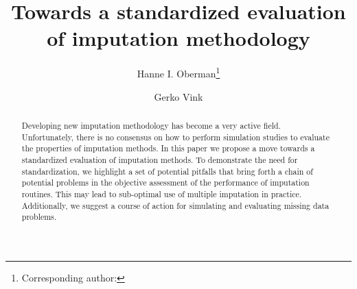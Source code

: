 \documentclass[bimj,fleqn]{w-art}
\begin{document}
\keywords{Evaluation; Imputation; Missing data; Simulation studies;\\ [1pc]
\noindent \hspace*{-4pc} Supporting Information for this article is available online from \\
\hspace*{-4pc} \underline{github.com/gerkovink/StandardizedEvaluation}. 
}  %

\title[Standardized evaluation]{Towards a standardized evaluation of imputation methodology}
\author[Oberman]{Hanne I. Oberman\footnote{Corresponding author: {}}} 
\address[\inst{1}]{Departement of Methodology \& Statistics, Padualaan 14, 3584 CH Utrecht, The Netherlands}
\author[Vink]{Gerko Vink}
   

\begin{abstract}
Developing new imputation methodology has become a very active field. Unfortunately, there is no consensus on how to perform simulation studies to evaluate the properties of imputation methods. In this paper we propose a move towards a standardized evaluation of imputation methods. To demonstrate the need for standardization, we highlight a set of potential pitfalls that bring forth a chain of potential problems in the objective assessment of the performance of imputation routines. This may lead to sub-optimal use of multiple imputation in practice. Additionally, we suggest a course of action for simulating and evaluating missing data problems.
\end{abstract}



\maketitle          %
\end{document}

